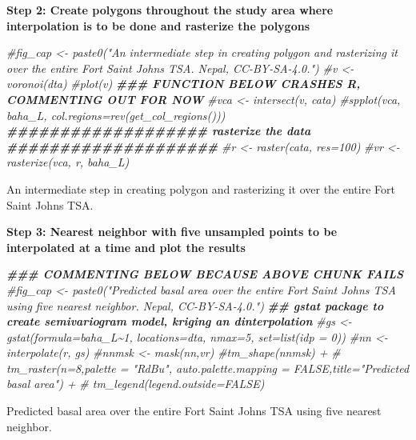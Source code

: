 \documentclass[
]{book}
\newenvironment{Shaded}{\begin{snugshade}}{\end{snugshade}}
\newcommand{\CommentTok}[1]{\textcolor[rgb]{0.56,0.35,0.01}{\textit{#1}}}
\newcommand{\DocumentationTok}[1]{\textcolor[rgb]{0.56,0.35,0.01}{\textbf{\textit{#1}}}}
\begin{document}
\textbf{Step 2: Create polygons throughout the study area where interpolation is to be done and rasterize the polygons}

\begin{Shaded}
\begin{Highlighting}[]
\CommentTok{\#fig\_cap \textless{}{-} paste0("An intermediate step in creating polygon and rasterizing it over the entire Fort Saint Johns TSA. Nepal, CC{-}BY{-}SA{-}4.0.")}
\CommentTok{\#v \textless{}{-} voronoi(dta)}
\CommentTok{\#plot(v)}
\DocumentationTok{\#\#\# FUNCTION BELOW CRASHES R, COMMENTING OUT FOR NOW}
\CommentTok{\#vca \textless{}{-} intersect(v, cata)}
\CommentTok{\#spplot(vca, \textquotesingle{}baha\_L\textquotesingle{}, col.regions=rev(get\_col\_regions()))}
\DocumentationTok{\#\#\#\#\#\#\#\#\#\#\#\#\#\#\#\#\#\#\# rasterize the data \#\#\#\#\#\#\#\#\#\#\#\#\#\#\#\#\#\#\#\#}
\CommentTok{\#r \textless{}{-} raster(cata, res=100)}
\CommentTok{\#vr \textless{}{-} rasterize(vca, r, \textquotesingle{}baha\_L\textquotesingle{})}
\end{Highlighting}
\end{Shaded}

An intermediate step in creating polygon and rasterizing it over the entire Fort Saint Johns TSA.

\textbf{Step 3: Nearest neighbor with five unsampled points to be interpolated at a time and plot the results}

\begin{Shaded}
\begin{Highlighting}[]
\DocumentationTok{\#\#\# COMMENTING BELOW BECAUSE ABOVE CHUNK FAILS}
\CommentTok{\#fig\_cap \textless{}{-} paste0("Predicted basal area over the entire Fort Saint Johns TSA using five nearest neighbor. Nepal, CC{-}BY{-}SA{-}4.0.")}
\DocumentationTok{\#\# gstat package to create semivariogram model, kriging an dinterpolation}
\CommentTok{\#gs \textless{}{-} gstat(formula=baha\_L\textasciitilde{}1, locations=dta, nmax=5, set=list(idp = 0))}
\CommentTok{\#nn \textless{}{-} interpolate(r, gs)}
\CommentTok{\#nnmsk \textless{}{-} mask(nn,vr)}
\CommentTok{\#tm\_shape(nnmsk) +}
\CommentTok{\#  tm\_raster(n=8,palette = "RdBu", auto.palette.mapping = FALSE,title="Predicted basal area") +}
\CommentTok{\#  tm\_legend(legend.outside=FALSE)}
\end{Highlighting}
\end{Shaded}

Predicted basal area over the entire Fort Saint Johns TSA using five nearest neighbor.
\end{document}
